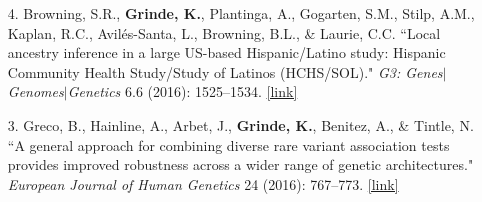 \documentclass[margin]{res}
\newcommand{\annotateItem}[1]{
	\begin{itemize} \vspace{-0.1cm}
	\item[] 
	\begin{footnotesize}\textcolor{black}{(#1)}\end{footnotesize}
	\end{itemize} \vspace{-0.1cm}
}
\begin{document}
\begin{resume}
\begin{itemize}
\item[4.] Browning, S.R., \textbf{Grinde, K.}, Plantinga, A., Gogarten, S.M., Stilp, A.M., Kaplan, R.C., Avil\'es-Santa, L., Browning, B.L., \& Laurie, C.C. ``Local ancestry inference in a large US-based Hispanic/Latino study: Hispanic Community Health Study/Study of Latinos (HCHS/SOL)." \textit{G3: Genes}$|$\textit{Genomes}$|$\textit{Genetics} 6.6 (2016): 1525--1534.
\href{https://academic.oup.com/g3journal/article/6/6/1525/6029932}{[link]}
	
\item[3.] Greco, B., Hainline, A., Arbet, J., \textbf{Grinde, K.}, Benitez, A., \& Tintle, N. ``A general approach for combining diverse rare variant association tests provides improved robustness across a wider range of genetic architectures." \textit{European Journal of Human Genetics} 24 (2016): 767--773.
\href{https://www.nature.com/articles/ejhg2015194}{[link]}
	

\end{itemize}
\end{resume}
\end{document}
